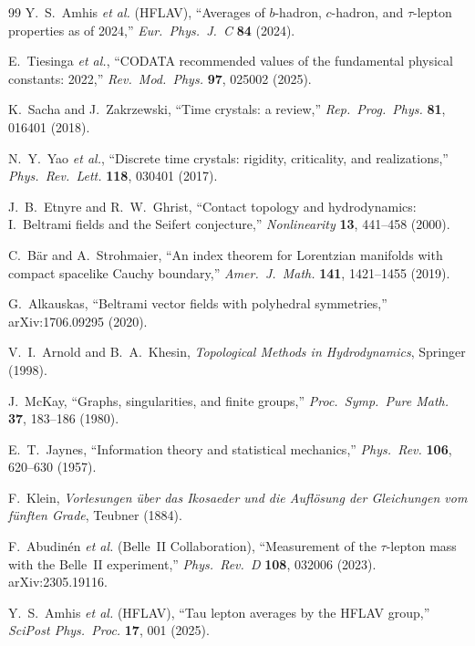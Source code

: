\documentclass[12pt,a4paper]{article}
\theoremstyle{definition}
\begin{document}
\begin{thebibliography}{99}
Y.~S.~Amhis \textit{et al.} (HFLAV),
``Averages of $b$-hadron, $c$-hadron, and $\tau$-lepton properties as of 2024,''
\textit{Eur.\ Phys.\ J.\ C} \textbf{84} (2024).

E.~Tiesinga \textit{et al.},
``CODATA recommended values of the fundamental physical constants: 2022,''
\textit{Rev.\ Mod.\ Phys.} \textbf{97}, 025002 (2025).

K.~Sacha and J.~Zakrzewski,
``Time crystals: a review,''
\textit{Rep.\ Prog.\ Phys.} \textbf{81}, 016401 (2018).

N.~Y.~Yao \textit{et al.},
``Discrete time crystals: rigidity, criticality, and realizations,''
\textit{Phys.\ Rev.\ Lett.} \textbf{118}, 030401 (2017).

J.~B.~Etnyre and R.~W.~Ghrist,
``Contact topology and hydrodynamics: I.\ Beltrami fields and the Seifert conjecture,''
\textit{Nonlinearity} \textbf{13}, 441--458 (2000).

C.~B\"ar and A.~Strohmaier,
``An index theorem for Lorentzian manifolds with compact spacelike Cauchy boundary,''
\textit{Amer.\ J.\ Math.} \textbf{141}, 1421--1455 (2019).

G.~Alkauskas,
``Beltrami vector fields with polyhedral symmetries,''
arXiv:1706.09295 (2020).

V.~I.~Arnold and B.~A.~Khesin,
\textit{Topological Methods in Hydrodynamics},
Springer (1998).

J.~McKay,
``Graphs, singularities, and finite groups,''
\textit{Proc.\ Symp.\ Pure Math.} \textbf{37}, 183--186 (1980).

E.~T.~Jaynes,
``Information theory and statistical mechanics,''
\textit{Phys.\ Rev.} \textbf{106}, 620--630 (1957).

F.~Klein,
\textit{Vorlesungen \"uber das Ikosaeder und die Aufl\"osung der Gleichungen vom f\"unften Grade},
Teubner (1884).

F.~Abudin\'en \textit{et al.} (Belle~II Collaboration),
``Measurement of the $\tau$-lepton mass with the Belle~II experiment,''
\textit{Phys.\ Rev.\ D} \textbf{108}, 032006 (2023).
arXiv:2305.19116.

Y.~S.~Amhis \textit{et al.} (HFLAV),
``Tau lepton averages by the HFLAV group,''
\textit{SciPost Phys.\ Proc.} \textbf{17}, 001 (2025).

\end{thebibliography}
\end{document}
